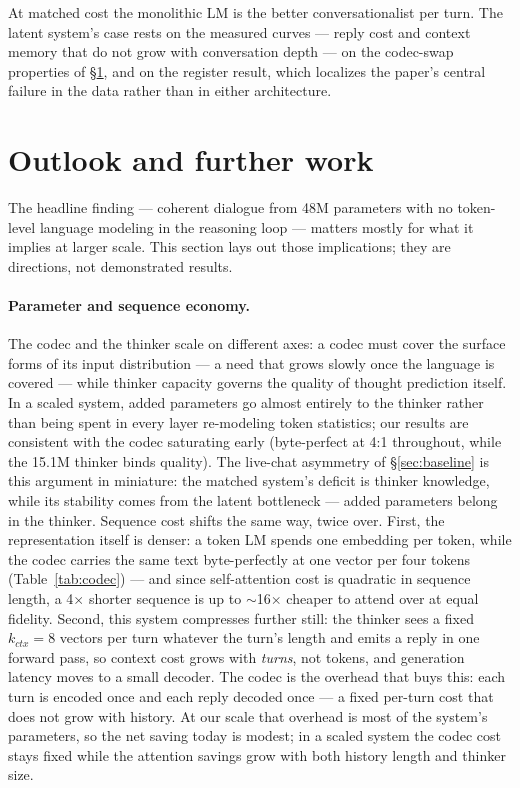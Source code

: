 \documentclass[11pt]{article}
\begin{document}
At matched cost the monolithic LM is the better
conversationalist per turn. The latent system's case rests on the
measured curves --- reply cost and context memory that do not grow
with conversation depth --- on the codec-swap properties of
\S\ref{sec:outlook}, and on the register result, which localizes the
paper's central failure in the data rather than in either architecture.

\section{Outlook and further work}
\label{sec:outlook}

The headline finding --- coherent dialogue from 48M parameters with no
token-level language modeling in the reasoning loop --- matters mostly for
what it implies at larger scale. This section lays out those implications;
they are directions, not demonstrated results.

\paragraph{Parameter and sequence economy.} The codec and the thinker scale
on different axes: a codec must cover the surface forms of its input
distribution --- a need that grows slowly once the language is covered ---
while thinker capacity governs the quality of thought prediction itself. In
a scaled system, added parameters go almost entirely to the thinker rather
than being spent in every layer re-modeling token statistics; our results
are consistent with the codec saturating early (byte-perfect at 4:1
throughout, while the 15.1M thinker binds quality). The live-chat
asymmetry of \S\ref{sec:baseline} is this argument in miniature: the
matched system's deficit is thinker knowledge, while its stability comes
from the latent bottleneck --- added parameters belong in the thinker. Sequence cost shifts
the same way, twice over. First, the representation itself is denser: a
token LM spends one embedding per token, while the codec carries the same
text byte-perfectly at one vector per four tokens (Table~\ref{tab:codec})
--- and since self-attention cost is quadratic in sequence length, a
4$\times$ shorter sequence is up to $\sim$16$\times$ cheaper to attend over
at equal fidelity. Second, this system compresses further still: the
thinker sees a fixed $k_{ctx}{=}8$ vectors per turn whatever the turn's
length and emits a reply in one forward pass, so context cost grows with
\emph{turns}, not tokens, and generation latency moves to a small decoder.
The codec is the overhead that buys this: each turn is encoded once and
each reply decoded once --- a fixed per-turn cost that does not grow with
history. At our scale that overhead is most of the system's parameters, so
the net saving today is modest; in a scaled system the codec cost stays
fixed while the attention savings grow with both history length and thinker
size.
\end{document}
